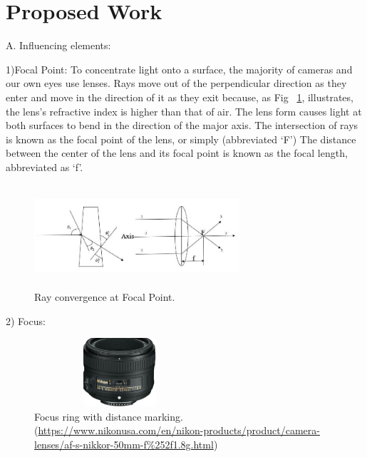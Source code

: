 \documentclass[sn-mathphys]{sn-jnl}%
\theoremstyle{thmstyleone}%
\theoremstyle{thmstyletwo}%
\theoremstyle{thmstylethree}%
\begin{document}
\section{Proposed Work}\label{sec4}

A. {Influencing elements}:

1){Focal Point:} To concentrate light onto a surface, the majority of cameras and our own eyes use lenses. Rays move out of the perpendicular direction as they enter and move in the direction of it as they exit because, as Fig ~\ref{Fig:Fig1}, illustrates, the lens's refractive index is higher than that of air. The lens form causes light at both surfaces to bend in the direction of the major axis. The intersection of rays is known as the focal point of the lens, or simply (abbreviated \lq{F}\rq) The distance between the center of the lens and its focal point is known as the focal length, abbreviated as \lq{f}\rq \hspace{.1cm}.
\begin{figure}[!htbp]
\centerline{\includegraphics[height=1.5in,width=3in]{fig1hdrb.jpg}}
\caption{Ray convergence at Focal Point.}
\label{Fig:Fig1}
\end{figure}\par

2) {Focus}:


\begin{figure}[!htbp]

\centerline{\includegraphics[height=1in,width=2.5in]{focusring.jpg}}
            \caption{Focus ring with distance marking.(\url{https://www.nikonusa.com/en/nikon-products/product/camera-lenses/af-s-nikkor-50mm-f\%252f1.8g.html})
\label{Fig:Fig2}}
\end{figure}\par
\end{document}
